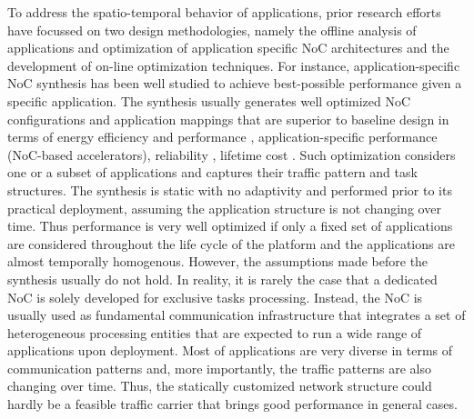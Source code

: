 \indent To address the spatio-temporal behavior of applications, prior research efforts have focussed on two design methodologies, namely the offline analysis of applications and optimization of application specific NoC architectures and the development of on-line optimization techniques. For instance, application-specific NoC synthesis has been well studied to achieve best-possible performance given a specific application. The synthesis usually generates well optimized NoC configurations and application mappings that are superior to baseline design in terms of energy efficiency and performance \cite{singh2013accelerating}\cite{srinivasan2006linear}, application-specific performance (NoC-based accelerators)\cite{majumder2013high}, reliability \cite{zou2013reliability}, lifetime cost \cite{meyer2010cost}. Such optimization considers one or a subset of applications and captures their traffic pattern and task structures. The synthesis is static with no adaptivity and performed prior to its practical deployment, assuming the application structure is not changing over time. Thus performance is very well optimized if only a fixed set of  applications are considered throughout the life cycle of the platform and the applications are almost temporally homogenous. However, the assumptions made before the synthesis usually do not hold. In reality, it is rarely the case that a dedicated NoC is solely developed for exclusive tasks processing. Instead, the NoC is usually used as fundamental communication infrastructure that integrates a set of heterogeneous processing entities that are expected to run a wide range of applications upon deployment. Most of  applications are very diverse in terms of communication patterns and, more importantly, the traffic patterns are also changing over time. Thus, the statically customized network structure could hardly be a feasible traffic carrier that brings good performance in general cases. 

